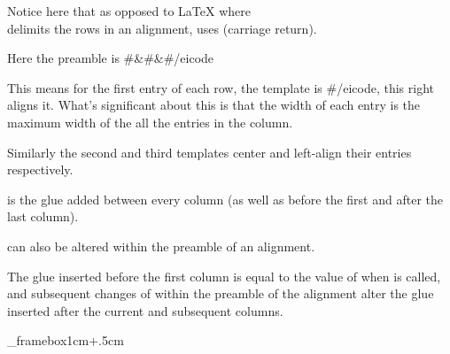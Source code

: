 {{    \textbox{}
        \tabskip=1cm
    \endtextbox

    \textbox\empty{1cm}{\lastey+.5cm}{\hsize-2cm}{}
        Notice here that as opposed to \LaTeX{} where \macroname\\{} delimits the rows in an alignment, \macroname\halign{} uses
        \macroname\cr{} (carriage return).

        Here the preamble is \icode #\hfil&\hfil#\hfil&\hfil#/eicode{}

        This means for the first entry of each row, the template is \icode #\hfil/eicode{}, this right aligns it.
        What's significant about this is that the width of each entry is the maximum width of the all the entries in the column.

        Similarly the second and third templates center and left-align their entries respectively.

        \macroname\tabskip{} is the glue added between every column (as well as before the first and after the last column).
    \endtextbox

\endslide

\beginslide
    \bheadline

    \textbox\empty{1cm}{2cm}{\hsize-2cm}{}
        \macroname\tabskip{} can also be altered within the preamble of an alignment.

        The glue inserted before the first column is equal to the value of \macroname\tabskip{} when \macroname\halign{} is called,
        and subsequent changes of \macroname\tabskip{} within the preamble of the alignment alter the glue inserted after the
        current and subsequent columns.
    \endtextbox

    \textbox\_framebox{1cm}{\lastey+.5cm}{\hsize-2cm}{}
\beginhi
\tabskip=0pt
\endhi
    \endtextbox

    \textbox{}
        \tabskip=0pt
    \endtextbox

}}
